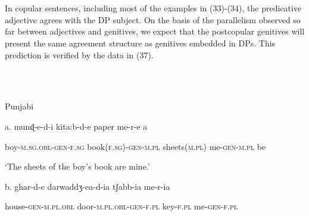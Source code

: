 \documentclass[output=paper]{langsci/langscibook}
\begin{document}
\begin{styleSfondomedioiColorexi}
\ea%
    \label{ex:key:36}
    \gll\\
        \\
    \glt
    \z

          
\end{styleSfondomedioiColorexi}

 
\begin{styleSfondomedioiColorexi}
In copular sentences, including most of the examples in (33)-(34), the predicative adjective agrees with the DP subject. On the basis of the parallelism observed so far between adjectives and genitives, we expect that the postcopular genitives will present the same agreement structure as genitives embedded in DPs. This prediction is verified by the data in (37).
\end{styleSfondomedioiColorexi}

\begin{styleSfondomedioiColorexi}
\ea%
    \label{ex:key:37}
    \gll\\
        \\
    \glt
    \z

          Punjabi
\end{styleSfondomedioiColorexi}

\begin{styleSfondomedioiColorexi}
  a.  munɖ-e-d-i   kita:b-d-e   paper   me-r-e  a 
\end{styleSfondomedioiColorexi}

\begin{stylefootnotetext}
      boy-\textsc{m.sg.obl-gen-f.sg}   book\textsc{(f.sg)-gen-m.pl}  sheets\textsc{(m.pl)}  me-\textsc{gen-m.pl}   be 
\end{stylefootnotetext}

\begin{styleSfondomedioiColorexi}
  ‘The sheets of the boy’s book are mine.’
\end{styleSfondomedioiColorexi}

\begin{styleSfondomedioiColorexi}
b.  ghar-d-e   darwaddʒ-ea-d-ia   tʃabb-ia   me-r-ia
\end{styleSfondomedioiColorexi}

\begin{styleSfondomedioiColorexi}
  house-\textsc{gen-m.pl.obl}  door-\textsc{m.pl.obl-gen-f.pl}  key-\textsc{f.pl}  me-\textsc{gen-f.pl}    
\end{styleSfondomedioiColorexi}
\end{document}
